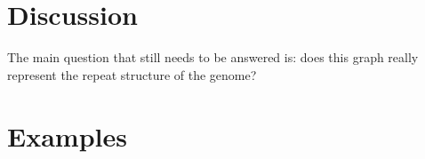 \documentclass[12pt]{article}
\begin{document}
\section{Discussion}
The main question that still needs to be answered is:
does this graph really represent the repeat structure of the genome?

\section{Examples}
\end{document}
